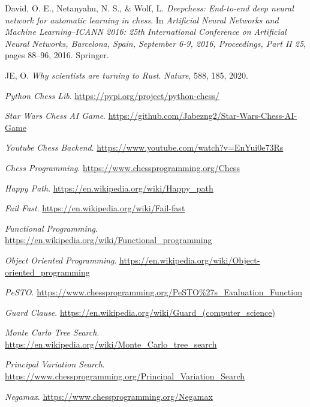 

\begin{thebibliography}{}

David, O. E., Netanyahu, N. S., \& Wolf, L.
\textit{Deepchess: End-to-end deep neural network for automatic learning in chess}.
In \textit{Artificial Neural Networks and Machine Learning--ICANN 2016: 25th International Conference on Artificial Neural Networks, Barcelona, Spain, September 6-9, 2016, Proceedings, Part II 25}, pages 88--96, 2016.
Springer.

JE, O.
\textit{Why scientists are turning to Rust}.
\textit{Nature}, 588, 185, 2020.

\textit{Python Chess Lib}.
\url{https://pypi.org/project/python-chess/}

\textit{Star Wars Chess AI Game}.
\url{https://github.com/Jabezng2/Star-Wars-Chess-AI-Game}

\textit{Youtube Chess Backend}.
\url{https://www.youtube.com/watch?v=EnYui0e73Rs}

\textit{Chess Programming}.
\url{https://www.chessprogramming.org/Chess}

\textit{Happy Path}.
\url{https://en.wikipedia.org/wiki/Happy\_path}

\textit{Fail Fast}.
\url{https://en.wikipedia.org/wiki/Fail-fast}

\textit{Functional Programming}.
\url{https://en.wikipedia.org/wiki/Functional\_programming}

\textit{Object Oriented Programming}.
\url{https://en.wikipedia.org/wiki/Object-oriented\_programming}

\textit{PeSTO}.
\url{https://www.chessprogramming.org/PeSTO\%27s\_Evaluation\_Function}

\textit{Guard Clause}.
\url{https://en.wikipedia.org/wiki/Guard\_(computer\_science)}

\textit{Monte Carlo Tree Search}.
\url{https://en.wikipedia.org/wiki/Monte\_Carlo\_tree\_search}

\textit{Principal Variation Search}.
\url{https://www.chessprogramming.org/Principal\_Variation\_Search}

\textit{Negamax}.
\url{https://www.chessprogramming.org/Negamax}

\end{thebibliography}
